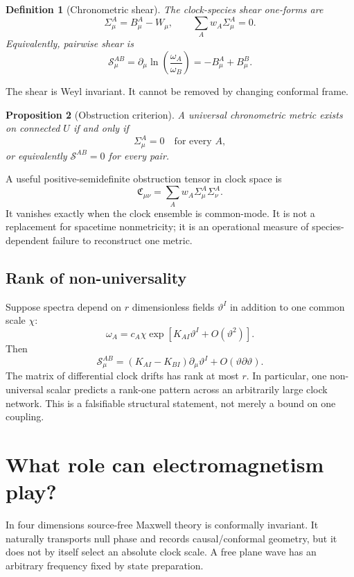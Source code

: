 \documentclass[11pt,a4paper]{article}
\newtheorem{definition}{Definition}[section]
\newtheorem{proposition}[definition]{Proposition}
\begin{document}
\begin{definition}[Chronometric shear]
The clock-species shear one-forms are
\[
 \Sigma^A_\mu=B^A_\mu-W_\mu,
 \qquad
 \sum_Aw_A\Sigma^A_\mu=0.
\]
Equivalently, pairwise shear is
\[
 \mathcal S^{AB}_\mu
 =\partial_\mu\ln\left(\frac{\omega_A}{\omega_B}\right)
 =-B^A_\mu+B^B_\mu.
\]
\end{definition}

The shear is Weyl invariant. It cannot be removed by changing conformal frame.

\begin{proposition}[Obstruction criterion]
A universal chronometric metric exists on connected $U$ if and only if
\[
 \Sigma^A_\mu=0
 \quad\text{for every }A,
\]
or equivalently $\mathcal S^{AB}=0$ for every pair.
\end{proposition}

A useful positive-semidefinite obstruction tensor in clock space is
\[
 \mathfrak C_{\mu\nu}
 =\sum_Aw_A\Sigma^A_\mu\Sigma^A_\nu.
\]
It vanishes exactly when the clock ensemble is common-mode. It is not a replacement for spacetime nonmetricity; it is an operational measure of species-dependent failure to reconstruct one metric.

\subsection{Rank of non-universality}

Suppose spectra depend on $r$ dimensionless fields $\vartheta^I$ in addition to one common scale $\chi$:
\[
 \omega_A=c_A\chi\exp\!\left[K_{AI}\vartheta^I+O(\vartheta^2)\right].
\]
Then
\[
 \mathcal S^{AB}_\mu
 =(K_{AI}-K_{BI})\partial_\mu\vartheta^I+O(\vartheta\partial\vartheta).
\]
The matrix of differential clock drifts has rank at most $r$. In particular, one non-universal scalar predicts a rank-one pattern across an arbitrarily large clock network. This is a falsifiable structural statement, not merely a bound on one coupling.

\section{What role can electromagnetism play?}

In four dimensions source-free Maxwell theory is conformally invariant. It naturally transports null phase and records causal/conformal geometry, but it does not by itself select an absolute clock scale. A free plane wave has an arbitrary frequency fixed by state preparation.
\end{document}
